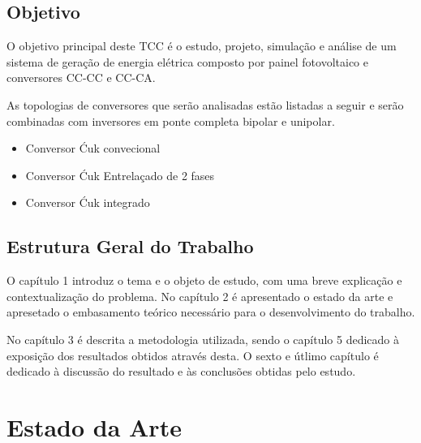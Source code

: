 \documentclass[
	12pt,				%
	openright,			%
	onseside,
	a4paper,			%
	english,			%
	french,				%
	spanish,			%
	brazil,				%
	]{abntex2}
\begin{document}
\section{Objetivo}

O objetivo principal deste TCC é o estudo, projeto, simulação e análise de um sistema de geração de energia elétrica composto por painel fotovoltaico e conversores CC-CC e CC-CA. 

As topologias de conversores que serão analisadas estão listadas a seguir e serão combinadas com inversores em ponte completa bipolar e unipolar.

\begin{itemize}
	
	\item Conversor Ćuk convecional
	\item Conversor Ćuk Entrelaçado de 2 fases
	\item Conversor Ćuk integrado
	
\end{itemize}

\section{Estrutura Geral do Trabalho}

O capítulo 1 introduz o tema e o objeto de estudo, com uma breve explicação e contextualização do problema. No capítulo 2 é apresentado o estado da arte e apresetado o embasamento teórico necessário para o desenvolvimento do trabalho.

No capítulo 3 é descrita a metodologia utilizada, sendo o capítulo 5 dedicado à exposição dos resultados obtidos através desta. O sexto e útlimo capítulo é dedicado à discussão do resultado e às conclusões obtidas pelo estudo.

\chapter{Estado da Arte}
\end{document}
